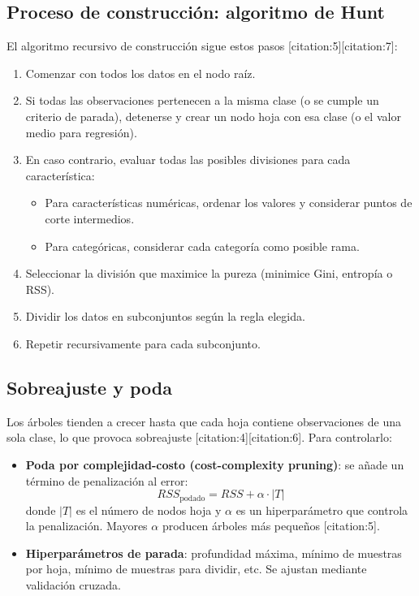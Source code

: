 \documentclass[12pt,a4paper,openany,oneside]{book}
\begin{document}
\subsection{Proceso de construcción: algoritmo de Hunt}
El algoritmo recursivo de construcción sigue estos pasos [citation:5][citation:7]:
\begin{enumerate}
    \item Comenzar con todos los datos en el nodo raíz.
    \item Si todas las observaciones pertenecen a la misma clase (o se cumple un criterio de parada), detenerse y crear un nodo hoja con esa clase (o el valor medio para regresión).
    \item En caso contrario, evaluar todas las posibles divisiones para cada característica:
        \begin{itemize}
            \item Para características numéricas, ordenar los valores y considerar puntos de corte intermedios.
            \item Para categóricas, considerar cada categoría como posible rama.
        \end{itemize}
    \item Seleccionar la división que maximice la pureza (minimice Gini, entropía o RSS).
    \item Dividir los datos en subconjuntos según la regla elegida.
    \item Repetir recursivamente para cada subconjunto.
\end{enumerate}

\subsection{Sobreajuste y poda}
Los árboles tienden a crecer hasta que cada hoja contiene observaciones de una sola clase, lo que provoca sobreajuste [citation:4][citation:6]. Para controlarlo:
\begin{itemize}
    \item \textbf{Poda por complejidad-costo (cost-complexity pruning)}: se añade un término de penalización al error:
    \[
    RSS_{\text{podado}} = RSS + \alpha \cdot |T|
    \]
    donde \(|T|\) es el número de nodos hoja y \(\alpha\) es un hiperparámetro que controla la penalización. Mayores \(\alpha\) producen árboles más pequeños [citation:5].
    \item \textbf{Hiperparámetros de parada}: profundidad máxima, mínimo de muestras por hoja, mínimo de muestras para dividir, etc. Se ajustan mediante validación cruzada.
\end{itemize}
\end{document}

